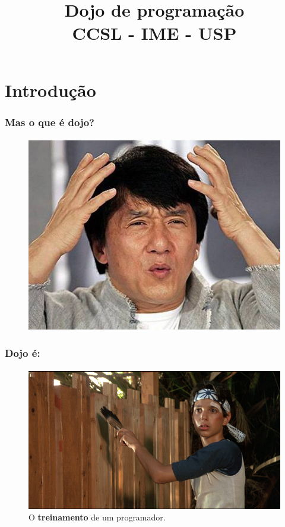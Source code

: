 \documentclass{beamer}
\title{
       \textbf{Dojo de programação} \\
       CCSL - IME - USP
      }
\begin{document}
\maketitle
\section{Introdução}

\begin{frame}
  \frametitle{Mas o que é dojo?}
  \framesubtitle{}
  
  \begin{figure}[htb]
    \begin{center}
      \includegraphics[scale=0.5]{jack.jpg}
    \end{center}
  \end{figure}
\end{frame}

\begin{frame}
  \frametitle{Dojo é:}
  \framesubtitle{}
  \begin{figure}[htb]
    \begin{center}
      \includegraphics[scale=0.35]{puxo.jpg}
      \caption{O \textbf{treinamento} de um programador.}
    \end{center}
  \end{figure}
\end{frame}
\end{document}
